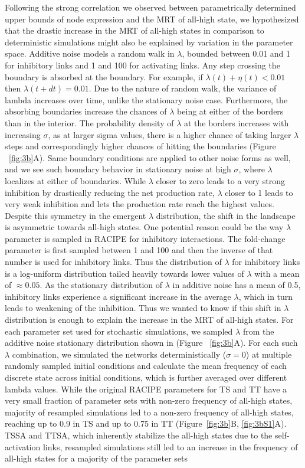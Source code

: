 \documentclass[11pt]{article}
\begin{document}
Following the strong correlation we observed between parametrically determined upper bounds of node expression and the MRT of all-high state, we hypothesized that the drastic increase in the MRT of all-high states in comparison to deterministic simulations might also be explained by variation in the parameter space. Additive noise models a random walk in $\lambda$, bounded between 0.01 and 1 for inhibitory links and 1 and 100 for activating links. Any step crossing the boundary is absorbed at the boundary. For example, if $\lambda(t) + \eta(t) < 0.01$ then $\lambda(t+dt) = 0.01$. Due to the nature of random walk, the variance of lambda increases over time, unlike the stationary noise case. Furthermore, the absorbing boundaries increase the chances of $\lambda$ being at either of the borders than in the interior. The probability density of $\lambda$ at the borders increases with increasing $\sigma$, as at larger sigma values, there is a higher chance of taking larger $\lambda$ steps and correspondingly higher chances of hitting the boundaries (Figure ~\ref{fig:3b}A). Same boundary conditions are applied to other noise forms as well, and we see such boundary behavior in stationary noise at high $\sigma$, where $\lambda$ localizes at either of boundaries. While $\lambda$ closer to zero leads to a very strong inhibition by drastically reducing the net production rate, $\lambda$ closer to 1 leads to very weak inhibition and lets the production rate reach the highest values. Despite this symmetry in the emergent $\lambda$ distribution, the shift in the landscape is asymmetric towards all-high states. One potential reason could be the way $\lambda$ parameter is sampled in RACIPE for inhibitory interactions. The fold-change parameter is first sampled between 1 and 100 and then the inverse of that number is used for inhibitory links. Thus the distribution of $\lambda$ for inhibitory links is a log-uniform distribution tailed heavily towards lower values of $\lambda$ with a mean of $\approx0.05$. As the stationary distribution of $\lambda$ in additive noise has a mean of 0.5, inhibitory links experience a significant increase in the average $\lambda$, which in turn leads to weakening of the inhibition. Thus we wanted to know if this shift in $\lambda$ distribution is enough to explain the increase in the MRT of all-high states. For each parameter set used for stochastic simulations, we sampled $\lambda$ from the additive noise stationary distribution shown in (Figure ~\ref{fig:3b}A). For each such $\lambda$ combination, we simulated the networks deterministically ($\sigma = 0$) at multiple randomly sampled initial conditions and calculate the mean frequency of each discrete state across initial conditions, which is further averaged over different lambda values. While the original RACIPE parameters for TS and TT have a very small fraction of parameter sets with non-zero frequency of all-high states, majority of resampled simulations led to a non-zero frequency of all-high states, reaching up to 0.9 in TS and up to 0.75 in TT (Figure~\ref{fig:3b}B, \ref{fig:3bS1}A). TSSA and TTSA, which inherently stabilize the all-high states due to the self-activation links, resampled simulations still led to an increase in the frequency of all-high states for a majority of the parameter sets 
\end{document}
